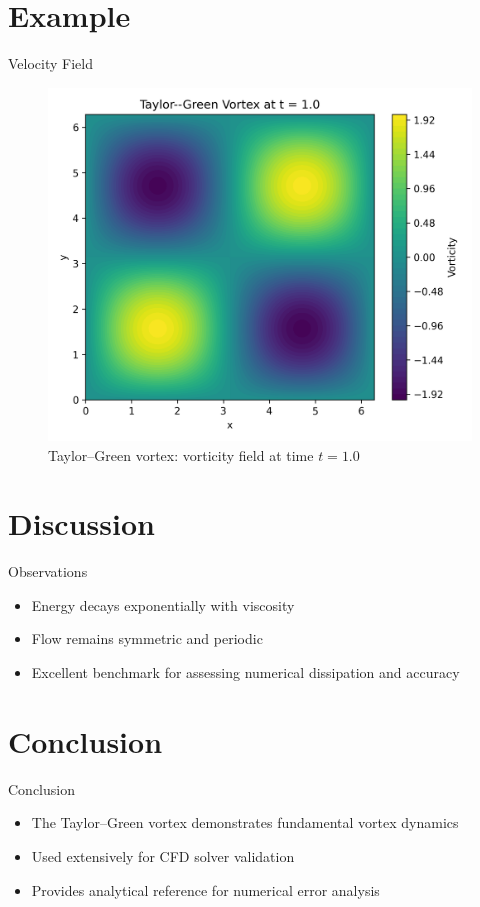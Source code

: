 \documentclass{beamer}
\begin{document}
\section{Example}
\begin{frame}{Velocity Field}
\begin{figure}[h]
\centering
\includegraphics[width=0.8\linewidth]{vortex_plot.png} %
\caption{Taylor--Green vortex: vorticity field at time $t = 1.0$}
\end{figure}
\end{frame}

\section{Discussion}
\begin{frame}{Observations}
\begin{itemize}
    \item Energy decays exponentially with viscosity
    \item Flow remains symmetric and periodic
    \item Excellent benchmark for assessing numerical dissipation and accuracy
\end{itemize}
\end{frame}

\section{Conclusion}
\begin{frame}{Conclusion}
\begin{itemize}
    \item The Taylor--Green vortex demonstrates fundamental vortex dynamics
    \item Used extensively for CFD solver validation
    \item Provides analytical reference for numerical error analysis
\end{itemize}
\end{frame}
\end{document}
